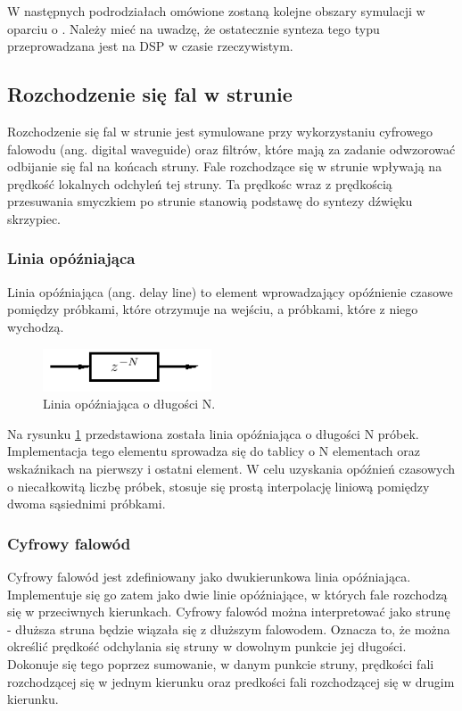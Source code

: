 W następnych podrodziałach omówione zostaną kolejne obszary symulacji w oparciu o \cite{bowed_smith}. Należy mieć na uwadzę, że ostatecznie synteza tego typu przeprowadzana jest na DSP w czasie rzeczywistym.


\subsection{Rozchodzenie się fal w strunie}
Rozchodzenie się fal w strunie jest symulowane przy wykorzystaniu cyfrowego falowodu (ang. digital waveguide) oraz filtrów, które mają za zadanie odwzorować odbijanie się fal na końcach struny. Fale rozchodzące się w strunie wpływają na prędkość lokalnych odchyleń tej struny. Ta prędkośc wraz z prędkością przesuwania smyczkiem po strunie stanowią podstawę do syntezy dźwięku skrzypiec.

\subsubsection{Linia opóźniająca}
Linia opóźniająca (ang. delay line) to element wprowadzający opóźnienie czasowe pomiędzy próbkami, które otrzymuje na wejściu, a próbkami, które z niego wychodzą. 
\begin{figure}[H]
	\centering
	\includegraphics[width=5cm]{grafiki/linia}
	\captionsetup{justification=centering}
	\caption{Linia opóźniająca o długości N.}
	\label{rys:delay_line}
\end{figure}
Na rysunku \ref{rys:delay_line} przedstawiona została linia opóźniająca o długości N próbek. Implementacja tego elementu sprowadza się do tablicy o N elementach oraz wskaźnikach na pierwszy i ostatni element. W celu uzyskania opóźnień czasowych o niecałkowitą liczbę próbek, stosuje się prostą interpolację liniową pomiędzy dwoma sąsiednimi próbkami.
\subsubsection{Cyfrowy falowód}
Cyfrowy falowód jest zdefiniowany jako dwukierunkowa linia opóźniająca. Implementuje się go zatem jako dwie linie opóźniające, w których fale rozchodzą się w przeciwnych kierunkach. Cyfrowy falowód można interpretować jako strunę - dłuższa struna będzie wiązała się z dłuższym falowodem. Oznacza to, że można określić prędkość odchylania się struny w dowolnym punkcie jej długości. Dokonuje się tego poprzez sumowanie, w danym punkcie struny, prędkości fali rozchodzącej się w jednym kierunku oraz predkości fali rozchodzącej się w drugim kierunku.
